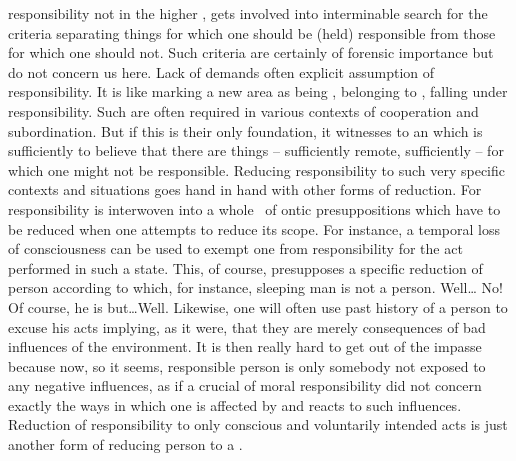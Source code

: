\pa {} responsibility not  in the higher
, gets involved into interminable search for the criteria separating
things for which one should be (held) responsible from those for which one
should not.  Such criteria are certainly of forensic importance but do not
concern us here. Lack of  demands often explicit assumption of
responsibility. It is like marking a new area as being , belonging to
, falling 
under  responsibility. Such  are often required in various
contexts of cooperation and subordination. But if this is their only foundation,
it witnesses to an  which is sufficiently  to believe that
there are things -- sufficiently remote, sufficiently  -- for which
one might not be responsible. Reducing responsibility to such very specific
contexts and situations goes hand in hand with other forms of reduction. For
responsibility is interwoven into a whole \nexus\ of ontic presuppositions which
have to be reduced when one attempts to reduce its scope. For instance, a temporal loss of
consciousness can be used to exempt one from responsibility for the act
performed in such a state. This, of course, presupposes a specific reduction of
person according to which, for instance, sleeping man is not a person. Well\ldots
No! Of course, he is but\ldots Well. Likewise, one will often use past history of
a person to excuse his acts implying, as it were, that they are merely
consequences of bad influences of the environment. It is then really hard to get
out of the impasse because now, so it seems, responsible person is only somebody
not exposed to any negative influences, as if a crucial  of moral
responsibility did not concern exactly the ways in which one is
affected by and reacts to such influences. Reduction of responsibility to only
conscious and voluntarily intended acts is just another form of reducing person to
a . 

